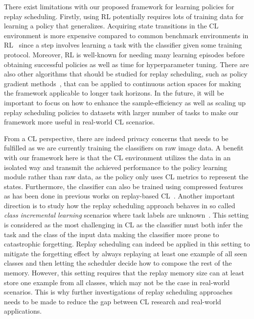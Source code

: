 There exist limitations with our proposed framework for learning policies for replay scheduling. Firstly, using RL potentially requires lots of training data for learning a policy that generalizes. Acquiring state transitions in the CL environment is more expensive compared to common benchmark environments in RL~\cite{brockman2016openai, bellemare2013arcade, duan2016benchmarking} since a step involves learning a task with the classifier given some training protocol. Moreover, RL is well-known for needing many learning episodes before obtaining successful policies as well as time for hyperparameter tuning. There are also other algorithms that should be studied for replay scheduling, such as policy gradient methods~\cite{mnih2016asynchronous, schulman2017proximal}, that can be applied to continuous action spaces for making the framework applicable to longer task horizons. In the future, it will be important to focus on how to enhance the sample-efficiency as well as scaling up replay scheduling policies to datasets with larger number of tasks to make our framework more useful in real-world CL scenarios.

From a CL perspective, there are indeed privacy concerns that needs to be fulfilled as we are currently training the classifiers on raw image data. A benefit with our framework here is that the CL environment utilizes the data in an isolated way and transmit the achieved performance to the policy learning module rather than raw data, as the policy only uses CL metrics to represent the states. Furthermore, the classifier can also be trained using compressed features as has been done in previous works on replay-based CL~\cite{hayes2020remind, pellegrini2019latent}. Another important direction is to study how the replay scheduling approach behaves in so called \textit{class incremental learning} scenarios where task labels are unknown~\cite{van2019three}. This setting is considered as the most challenging in CL as the classifier must both infer the task and the class of the input data making the classifier more prone to catastrophic forgetting. Replay scheduling can indeed be applied in this setting to mitigate the forgetting effect by always replaying at least one example of all seen classes and then letting the scheduler decide how to compose the rest of the memory. However, this setting requires that the replay memory size can at least store one example from all classes, which may not be the case in real-world scenarios. This is why further investigations of replay scheduling approaches needs to be made to reduce the gap between CL research and real-world applications.  

